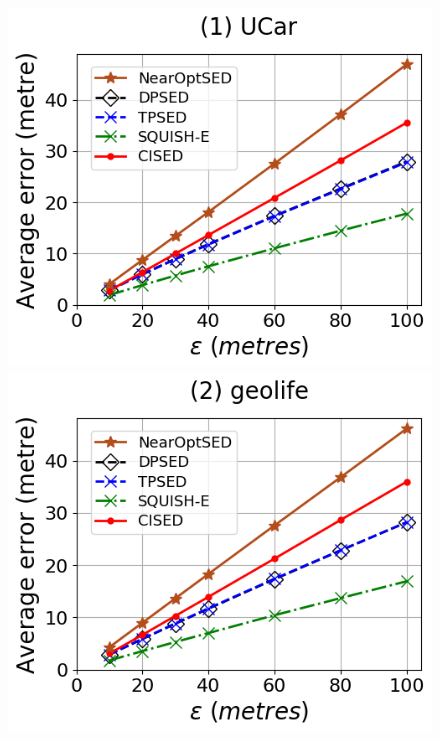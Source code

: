 \begin{figure}[tb!]
	\centering
	\includegraphics[scale=0.315]{Figures/Exp-PED-error-epsilon-service.png}	\hspace{1ex}
	\includegraphics[scale=0.315]{Figures/Exp-PED-error-epsilon-geolife.png}	\hspace{1ex}

\end{figure}
